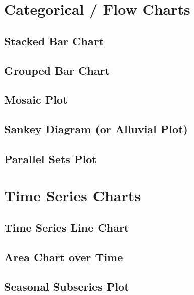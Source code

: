 \documentclass[
  letterpaper,
  DIV=11,
  numbers=noendperiod]{scrreprt}
\begin{document}
\section{Categorical / Flow Charts}\label{categorical-flow-charts}

\subsection{Stacked Bar Chart}\label{stacked-bar-chart}

\subsection{Grouped Bar Chart}\label{grouped-bar-chart}

\subsection{Mosaic Plot}\label{mosaic-plot}

\subsection{Sankey Diagram (or Alluvial
Plot)}\label{sankey-diagram-or-alluvial-plot}

\subsection{Parallel Sets Plot}\label{parallel-sets-plot}

\section{Time Series Charts}\label{time-series-charts}

\subsection{Time Series Line Chart}\label{time-series-line-chart}

\subsection{Area Chart over Time}\label{area-chart-over-time}

\subsection{Seasonal Subseries Plot}\label{seasonal-subseries-plot}
\end{document}
